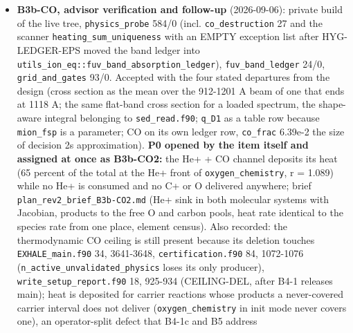 \documentclass[english,a4paper]{my_memo}
\begin{document}
\begin{itemize}
{  (\texttt{ionization\_equilibrium.f90}), plus the two-pass rest mask with an
  acceptance class inherited by masked cells}: assigned as COST2, after
  B3b-CO releases that file. Also fixed: the cost line divided passes over
  loop entries by adopted steps (could report a mean above the worst);
  \texttt{heat\_channel\_state} is in the checkpoint with two assertions
  (\texttt{attempted\_step} 97/0, \texttt{coupled\_source\_step} 36/0; advisor rebuild and
  rerun green). Outside scope recorded: \texttt{EXHALE\_ERR\_EVERY} read in both modes
  but the probe runs only in phys; \texttt{mol\_base\_handoff} in phys mode refuses 7
  of its first 20 steps at the fixed point (pass cap at step 0), recovers.
\item
  \textbf{B3b-CO, advisor verification and follow-up} (2026-09-06): private build
  of the live tree, \texttt{physics\_probe} 584/0 (incl. \texttt{co\_destruction} 27 and the
  scanner \texttt{heating\_sum\_uniqueness} with an EMPTY exception list after
  HYG-LEDGER-EPS moved the band ledger into \texttt{utils\_ion\_eq::fuv\_band\_absorption\_ledger}),
  \texttt{fuv\_band\_ledger} 24/0, \texttt{grid\_and\_gates} 93/0. Accepted with the four stated
  departures from the design (cross section as the mean over the 912-1201 A
  beam of one that ends at 1118 A; the same flat-band cross section for a
  loaded spectrum, the shape-aware integral belonging to \texttt{sed\_read.f90};
  \texttt{q\_D1} as a table row because \texttt{mion\_fsp} is a parameter; CO on its own
  ledger row, \texttt{co\_frac} 6.39e-2 the size of decision 2\textquotesingle s approximation).
  \textbf{P0 opened by the item itself and assigned at once as B3b-CO2:} the He+ +
  CO channel deposits its heat (65 percent of the total at the He+ front of
  \texttt{oxygen\_chemistry}, r = 1.089) while no He+ is consumed and no C+ or O
  delivered anywhere; brief \texttt{plan\_rev2\_brief\_B3b-CO2.md} (He+ sink in both
  molecular systems with Jacobian, products to the free O and carbon pools,
  heat rate identical to the species rate from one place, element census).
  Also recorded: the thermodynamic CO ceiling is still present because its
  deletion touches \texttt{EXHALE\_main.f90} 34, 3641-3648, \texttt{certification.f90} 84,
  1072-1076 (\texttt{n\_active\_unvalidated\_physics} loses its only producer),
  \texttt{write\_setup\_report.f90} 18, 925-934 (CEILING-DEL, after B4-1 releases
  main); heat is deposited for carrier reactions whose products a
  never-covered carrier interval does not deliver (\texttt{oxygen\_chemistry} in init
  mode never covers one), an operator-split defect that B4-1c and B5 address

\end{itemize}
\end{document}
